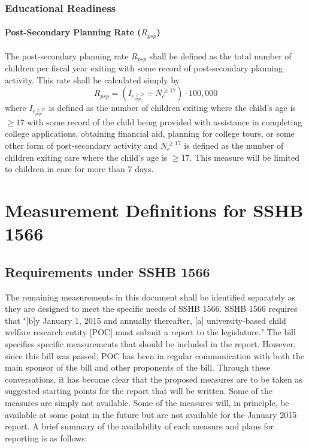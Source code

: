 \documentclass[12pt]{article}\usepackage[]{graphicx}\usepackage[]{color}
\begin{document}
\subsubsection{Educational Readiness}

\paragraph{Post-Secondary Planning Rate ($R_{psp}$)}

The post-secondary planning rate $R_{psp}$ shall be defined as the total number of children per fiscal year exiting with some record of post-secondary planning activity. This rate shall be calculated simply by 
\begin{equation}\label{eq:Rpsp}
R_{psp} = (I_{e_{psp}^{\geq17}} \div N_e^{\geq17}) \cdot 100,000
\end{equation}
where $I_{e_{psp}^{\geq17}}$ is defined as the number of children exiting where the child's age is $\geq17$ with some record of the child being provided with assistance in completing college applications, obtaining financial aid, planning for college tours, or some other form of post-secondary activity and $N_e^{\geq17}$ is defined as the number of children exiting care where the child's age is $\geq17$. This measure will be limited to children in care for more than 7 days.

\section{Measurement Definitions for SSHB 1566}

\subsection{Requirements under SSHB 1566}

The remaining measurements in this document shall be identified separately as they are designed to meet the specific needs of SSHB 1566. SSHB 1566 requires that "[b]y January 1, 2015 and annually thereafter, [a] university-based child welfare research entity [POC] must submit a report to the legislature." The bill specifies specific measurements that should be included in the report. However, since this bill was passed, POC has been in regular communication with both the main sponsor of the bill and other proponents of the bill. Through these conversations, it has become clear that the proposed measures are to be taken as suggested starting points for the report that will be written. Some of the measures are simply not available. Some of the measures will, in principle, be available at some point in the future but are not available for the January 2015 report. A brief summary of the availability of each measure and plans for reporting is as follows:
\end{document}
